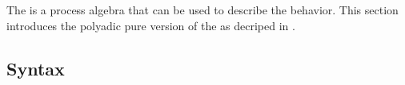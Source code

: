The \findex[\picalc{}|(]{\picalc{}} is a process algebra that can be used to describe the behavior. This section introduces the polyadic pure version of the \picalc{} as decriped in \cite{milner}. 


\subsection{Syntax}
\label{sec_pi_syntax}


\newpage %
